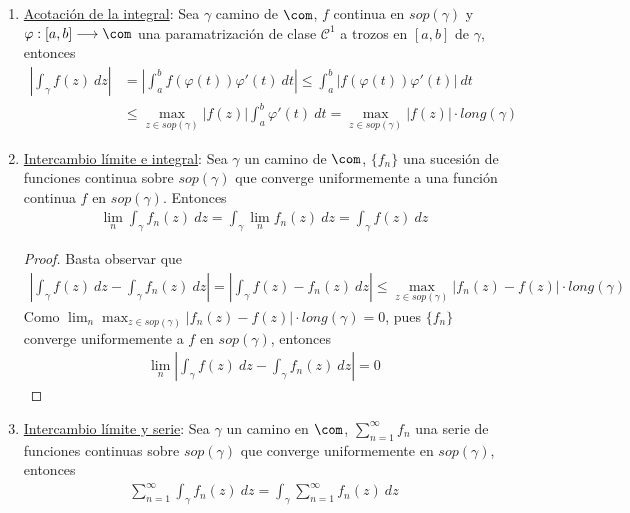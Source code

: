 \begin{obs}
\begin{enumerate}
    \item \underline{Acotación de la integral}: Sea $\gamma$ camino de $\com$, $f$ continua en $sop(\gamma)$ y $\varphi : [a,b] \longrightarrow \com$ una paramatrización de clase $\mathscr{C}^1$ a trozos  en $[a,b]$ de $\gamma$, entonces 
    \begin{align*}
        \left| \int_{\gamma}{f(z) \ dz} \right| &= \left| \int_{a}^{b}{f(\varphi(t))\varphi'(t) \ dt} \right| \leq \int_{a}^{b}{\left|f(\varphi(t))\varphi'(t) \right|\ dt} \\
        & \leq \max_{z \in sop(\gamma)} |f(z)|\int_{a}^{b}{\varphi'(t) \ dt} = \max_{z \in sop(\gamma)} |f(z)| \cdot long(\gamma)
    \end{align*}
    \item \underline{Intercambio límite e integral}: Sea $\gamma$ un camino de $\com$, $\{f_n\}$ una sucesión de funciones continua sobre $sop(\gamma)$ que converge uniformemente a una función continua $f$ en $sop(\gamma)$. Entonces
    \begin{align*}
        \lim_{n}{\int_{\gamma}{f_n(z) \ dz}} = \int_{\gamma}{\lim_{n}f_n(z) \ dz} = \int_{\gamma}{f(z) \ dz}
    \end{align*}
    \begin{proof}
    Basta observar que
    \begin{align*}
        \left| \int_{\gamma}{f(z) \ dz} -  \int_{\gamma}{f_n(z) \ dz}\right|= \left| \int_{\gamma}{f(z) - f_n(z) \ dz} \right| \leq \max_{z \in sop(\gamma)} |f_n(z) - f(z)| \cdot long(\gamma)
    \end{align*}
    Como $\lim_n{\max_{z \in sop(\gamma)} |f_n(z) - f(z)| \cdot long(\gamma)} = 0$, pues $\{f_n\}$ converge uniformemente a $f$ en $sop(\gamma)$, entonces 
    \begin{align*}
        \lim_{n}  \left| \int_{\gamma}{f(z) \ dz} -  \int_{\gamma}{f_n(z) \ dz}\right| = 0
    \end{align*}
    \end{proof}
    \item \underline{Intercambio límite y serie}: Sea $\gamma$ un camino en $\com$, $\sum_{n=1}^{\infty}{f_n}$ una serie de funciones continuas sobre $sop(\gamma)$ que converge uniformemente en $sop(\gamma)$, entonces
    \begin{align*}
        \sum_{n=1}^{\infty} \int_{\gamma}{f_n(z) \ dz} = \int_{\gamma}{\sum_{n=1}^{\infty} f_n(z) \ dz}
    \end{align*}
\end{enumerate}
\end{obs}

